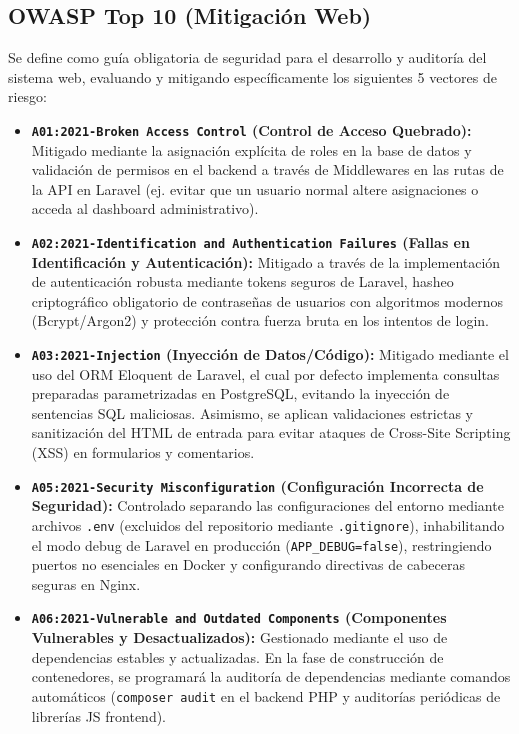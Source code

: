 \subsection{OWASP Top 10 (Mitigación Web)}
Se define como guía obligatoria de seguridad para el desarrollo y auditoría del sistema web, evaluando y mitigando específicamente los siguientes 5 vectores de riesgo:

\begin{itemize}
    \item \textbf{\texttt{A01:2021-Broken Access Control} (Control de Acceso Quebrado):} Mitigado mediante la asignación explícita de roles en la base de datos y validación de permisos en el backend a través de Middlewares en las rutas de la API en Laravel (ej. evitar que un usuario normal altere asignaciones o acceda al dashboard administrativo).
    
    \item \textbf{\texttt{A02:2021-Identification and Authentication Failures} (Fallas en Identificación y Autenticación):} Mitigado a través de la implementación de autenticación robusta mediante tokens seguros de Laravel, hasheo criptográfico obligatorio de contraseñas de usuarios con algoritmos modernos (Bcrypt/Argon2) y protección contra fuerza bruta en los intentos de login.
    
    \item \textbf{\texttt{A03:2021-Injection} (Inyección de Datos/Código):} Mitigado mediante el uso del ORM Eloquent de Laravel, el cual por defecto implementa consultas preparadas parametrizadas en PostgreSQL, evitando la inyección de sentencias SQL maliciosas. Asimismo, se aplican validaciones estrictas y sanitización del HTML de entrada para evitar ataques de Cross-Site Scripting (XSS) en formularios y comentarios.
    
    \item \textbf{\texttt{A05:2021-Security Misconfiguration} (Configuración Incorrecta de Seguridad):} Controlado separando las configuraciones del entorno mediante archivos \texttt{.env} (excluidos del repositorio mediante \texttt{.gitignore}), inhabilitando el modo debug de Laravel en producción (\texttt{APP\_DEBUG=false}), restringiendo puertos no esenciales en Docker y configurando directivas de cabeceras seguras en Nginx.
    
    \item \textbf{\texttt{A06:2021-Vulnerable and Outdated Components} (Componentes Vulnerables y Desactualizados):} Gestionado mediante el uso de dependencias estables y actualizadas. En la fase de construcción de contenedores, se programará la auditoría de dependencias mediante comandos automáticos (\texttt{composer audit} en el backend PHP y auditorías periódicas de librerías JS frontend).
\end{itemize}